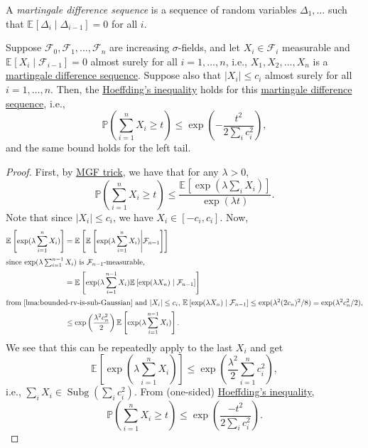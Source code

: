 \begin{definition}\label{def:martingale-difference-sequence}
	A \emph{martingale difference sequence} is a sequence of random variables \(\Delta _1, \dots \) such that \(\mathbb{E}_{}\left[\Delta _i \mid \Delta _{i-1} \right] = 0\) for all \(i\).
\end{definition}

\begin{theorem}\label{thm:Azuma-Hoeffding-inequality}
	Suppose \(\mathcal{F} _0, \mathcal{F} _1, \dots , \mathcal{F} _n \) are increasing \(\sigma \)-fields, and let \(X_i \in \mathcal{F} _i\) measurable and \(\mathbb{E}_{}\left[X_i \mid \mathcal{F} _{i-1} \right] = 0\) almost surely for all \(i=1, \dots , n\), i.e., \(X_1, X_2, \dots , X_n\) is a \hyperref[def:martingale-difference-sequence]{martingale difference sequence}. Suppose also that \(\vert X_i \vert \leq c_i\) almost surely for all \(i = 1, \dots , n\). Then, the \hyperref[thm:Hoeffding-inequality]{Hoeffding's inequality} holds for this \hyperref[def:martingale-difference-sequence]{martingale difference sequence}, i.e.,
	\[
		\mathbb{P} \left( \sum_{i=1}^{n} X_i \geq t \right) \leq \exp(- \frac{t^2}{2 \sum_{i} c_i^2}),
	\]
	and the same bound holds for the left tail.
\end{theorem}
\begin{proof}
	First, by \hyperref[lma:MGF-trick]{MGF trick}, we have that for any \(\lambda >0\),
	\[
		\mathbb{P} \left( \sum_{i=1}^{n} X_i \geq t \right)
		\leq \frac{\mathbb{E}_{}\left[\exp (\lambda \sum_{i} X_i) \right] }{\exp (\lambda t)}.
	\]
	Note that since \(\vert X_i \vert \leq c_i\), we have \(X_i \in [- c_i, c_i]\). Now,
	\begin{align*}
		\mathbb{E}_{}\left[\exp (\lambda \sum_{i=1}^{n} X_i) \right]
		 & = \mathbb{E}_{}\left[\mathbb{E}_{}\left[\exp (\lambda \sum_{i=1}^n X_i ) \middle| \mathcal{F} _{n-1} \right]  \right]                  \\
		\shortintertext{since \(\exp (\lambda \sum_{i=1}^{n-1} X_i )\) is \(\mathcal{F} _{n-1}\)-measurable,}
		 & = \mathbb{E}_{}\left[\exp (\lambda \sum_{i=1}^{n-1} X_i) \mathbb{E}_{}\left[\exp (\lambda X_n) \mid \mathcal{F} _{n-1} \right] \right] \\
		\shortintertext{from \autoref{lma:bounded-rv-is-sub-Gaussian} and \(\vert X_i \vert \leq c_i\), \(\mathbb{E}_{}\left[\exp (\lambda X_n) \mid \mathcal{F} _{n-1} \right] \leq \exp (\lambda ^2 (2c_n)^2 / 8) = \exp (\lambda ^2 c_n^2 / 2)\),}
		 & \leq \exp \left( \frac{\lambda ^2 c_n^2}{2} \right) \mathbb{E}_{}\left[\exp (\lambda \sum_{i=1}^{n-1} X_i) \right].
	\end{align*}
	We see that this can be repeatedly apply to the last \(X_i\) and get
	\[
		\mathbb{E}_{}\left[\exp (\lambda \sum_{i=1}^{n} X_i) \right]
		\leq \exp \left( \frac{\lambda ^2}{2}\sum_{i=1}^{n} c_i^2 \right),
	\]
	i.e., \(\sum_{i} X_i\in \mathop{\mathrm{Subg}}(\sum_{i} c_i^2) \). From (one-sided) \hyperref[thm:Hoeffding-inequality]{Hoeffding's inequality},
	\[
		\mathbb{P} \left( \sum_{i=1}^{n} X_i \geq t \right)
		\leq \exp \left( \frac{-t^2}{2 \sum_{i} c_i^2} \right).
	\]
\end{proof}

